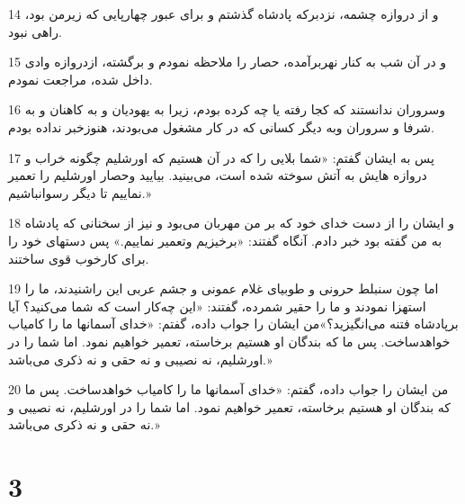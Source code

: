 \par 14 و از دروازه چشمه، نزدبرکه پادشاه گذشتم و برای عبور چهارپایی که زیرمن بود، راهی نبود.
\par 15 و در آن شب به کنار نهربرآمده، حصار را ملاحظه نمودم و برگشته، ازدروازه وادی داخل شده، مراجعت نمودم.
\par 16 وسروران ندانستند که کجا رفته یا چه کرده بودم، زیرا به یهودیان و به کاهنان و به شرفا و سروران وبه دیگر کسانی که در کار مشغول می‌بودند، هنوزخبر نداده بودم.
\par 17 پس به ایشان گفتم: «شما بلایی را که در آن هستیم که اورشلیم چگونه خراب و دروازه هایش به آتش سوخته شده است، می‌بینید. بیایید وحصار اورشلیم را تعمیر نماییم تا دیگر رسوانباشیم.»
\par 18 و ایشان را از دست خدای خود که بر من مهربان می‌بود و نیز از سخنانی که پادشاه به من گفته بود خبر دادم. آنگاه گفتند: «برخیزیم وتعمیر نماییم.» پس دستهای خود را برای کارخوب قوی ساختند.
\par 19 اما چون سنبلط حرونی و طوبیای غلام عمونی و جشم عربی این راشنیدند، ما را استهزا نمودند و ما را حقیر شمرده، گفتند: «این چه‌کار است که شما می‌کنید؟ آیا برپادشاه فتنه می‌انگیزید؟»من ایشان را جواب داده، گفتم: «خدای آسمانها ما را کامیاب خواهدساخت. پس ما که بندگان او هستیم برخاسته، تعمیر خواهیم نمود. اما شما را در اورشلیم، نه نصیبی و نه حقی و نه ذکری می‌باشد.»
\par 20 من ایشان را جواب داده، گفتم: «خدای آسمانها ما را کامیاب خواهدساخت. پس ما که بندگان او هستیم برخاسته، تعمیر خواهیم نمود. اما شما را در اورشلیم، نه نصیبی و نه حقی و نه ذکری می‌باشد.»
 
\chapter{3}


